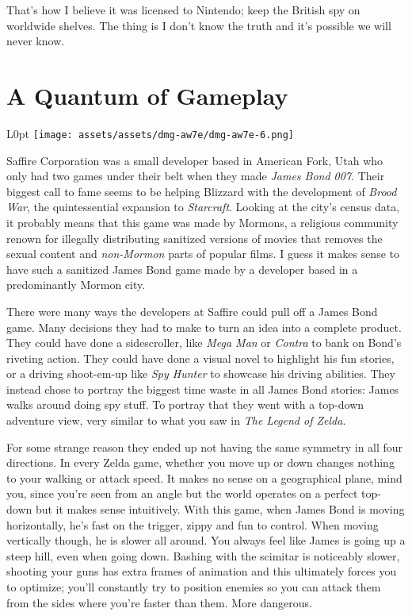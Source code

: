 \documentclass{book}
\begin{document}
That’s how I believe it was licensed to Nintendo; keep the British spy on worldwide shelves. The thing is I don’t know the truth and it’s possible we will never know.

\FloatBarrier\needspace{5pt}\section*{A Quantum of Gameplay}\nopagebreak[4]

\begin{wrapfigure}{L}{0pt} \texttt{[image: assets/assets/dmg-aw7e/dmg-aw7e-6.png]}\end{wrapfigure}
Saffire Corporation was a small developer based in American Fork, Utah who only had two games under their belt when they made \emph{James Bond 007}. Their biggest call to fame seems to be helping Blizzard with the development of \emph{Brood War}, the quintessential expansion to \emph{Starcraft}. Looking at the city’s census data, it probably means that this game was made by Mormons, a religious community renown for illegally distributing sanitized versions of movies that removes the sexual content and \emph{non-Mormon} parts of popular films. I guess it makes sense to have such a sanitized James Bond game made by a developer based in a predominantly Mormon city.

There were many ways the developers at Saffire could pull off a James Bond game. Many decisions they had to make to turn an idea into a complete product. They could have done a sidescroller, like \emph{Mega Man} or \emph{Contra} to bank on Bond’s riveting action. They could have done a visual novel to highlight his fun stories, or a driving shoot-em-up like \emph{Spy Hunter} to showcase his driving abilities. They instead chose to portray the biggest time waste in all James Bond stories: James walks around doing spy stuff. To portray that they went with a top-down adventure view, very similar to what you saw in \emph{The Legend of Zelda}.

For some strange reason they ended up not having the same symmetry in all four directions. In every Zelda game, whether you move up or down changes nothing to your walking or attack speed. It makes no sense on a geographical plane, mind you, since you’re seen from an angle but the world operates on a perfect top-down but it makes sense intuitively. With this game, when James Bond is moving horizontally, he’s fast on the trigger, zippy and fun to control. When moving vertically though, he is slower all around. You always feel like James is going up a steep hill, even when going down. Bashing with the scimitar is noticeably slower, shooting your guns has extra frames of animation and this ultimately forces you to optimize; you’ll constantly try to position enemies so you can attack them from the sides where you’re faster than them. More dangerous.
\end{document}
